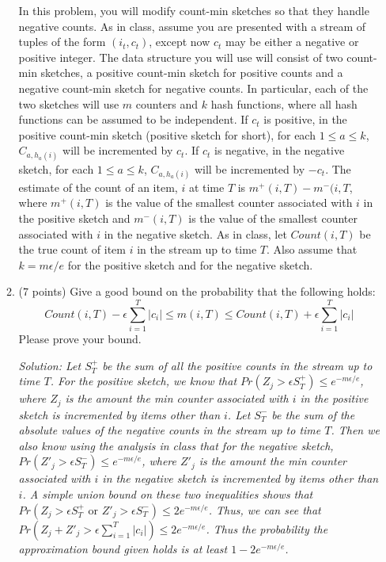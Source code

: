 \documentclass[11pt]{article}
\newcommand{\ans}[1]{\emph{Solution: #1}}
\begin{document}
\begin{enumerate}
\begin{enumerate}
\pagebreak

In this problem, you will modify count-min sketches so that they handle negative counts.  As in class, assume you are presented with a stream of tuples of the form $(i_{t},c_{t})$, except now $c_{t}$ may be either a negative or positive integer.  The data structure you will use will consist of two count-min sketches, a positive count-min sketch for positive counts and a negative count-min sketch for negative counts.  In particular, each of the two sketches will use $m$ counters and $k$ hash functions, where all hash functions can be assumed to be independent.  If $c_{t}$ is positive, in the positive count-min sketch (positive sketch for short),  for each $1 \leq a \leq k$, $C_{a,h_{a}(i)}$ will be incremented by $c_{t}$.  If $c_{t}$ is negative, in the negative sketch, for each $1 \leq a \leq k$, $C_{a,h_{a}(i)}$ will be incremented by $-c_{t}$.   The estimate of the count of an item, $i$ at time $T$ is $m^{+}(i,T) - m^{-}(i,T$, where $m^{+}(i,T)$ is the value of the smallest counter associated with $i$ in the positive sketch and $m^{-}(i,T)$ is the value of the smallest counter associated with $i$ in the negative sketch.  As in class, let $Count(i,T)$ be the true count of item $i$ in the stream up to time $T$.  Also assume that $k = m \epsilon/e$ for the positive sketch and for the negative sketch.
 
 \item (7 points) Give a good bound on the probability that the following holds:\\
 $$ Count(i,T) - \epsilon \sum_{i=1}^{T} |c_{i}| \leq m(i,T) \leq Count(i,T) + \epsilon \sum_{i=1}^{T} |c_{i}| $$
 Please prove your bound.
 
 
 \ans{Let $S^{+}_{T}$ be the sum of all the positive counts in the stream up to time $T$.  For the positive sketch, we know that $Pr(Z_{j}> \epsilon S^{+}_{T}) \leq e^{-m\epsilon/e}$, where $Z_{j}$ is the amount the min counter associated with $i$ in the positive sketch is incremented by items other than $i$.  Let $S^{-}_{T}$ be the sum of the absolute values of the negative counts in the stream up to time $T$.  Then we also know using the analysis in class that for the negative sketch, $Pr(Z'_{j}> \epsilon S^{-}_{T}) \leq e^{-m\epsilon/e}$, where $Z'_{j}$ is the amount the min counter associated with $i$ in the negative sketch is incremented by items other than $i$.   A simple union bound on these two inequalities shows that $Pr(Z_{j}> \epsilon S^{+}_{T} \textrm{ or } Z'_{j}> \epsilon S^{-}_{T}) \leq 2 e^{-m\epsilon/e}$.  Thus, we can see that $Pr(Z_{j} + Z'_{j} > \epsilon \sum_{i=1}^{T} |c_{i}|) \leq  2 e^{-m\epsilon/e}$.  Thus the probability the approximation bound given holds is at least $1 - 2 e^{-m\epsilon/e}$. }


\end{enumerate}
\end{enumerate}
\end{document}
